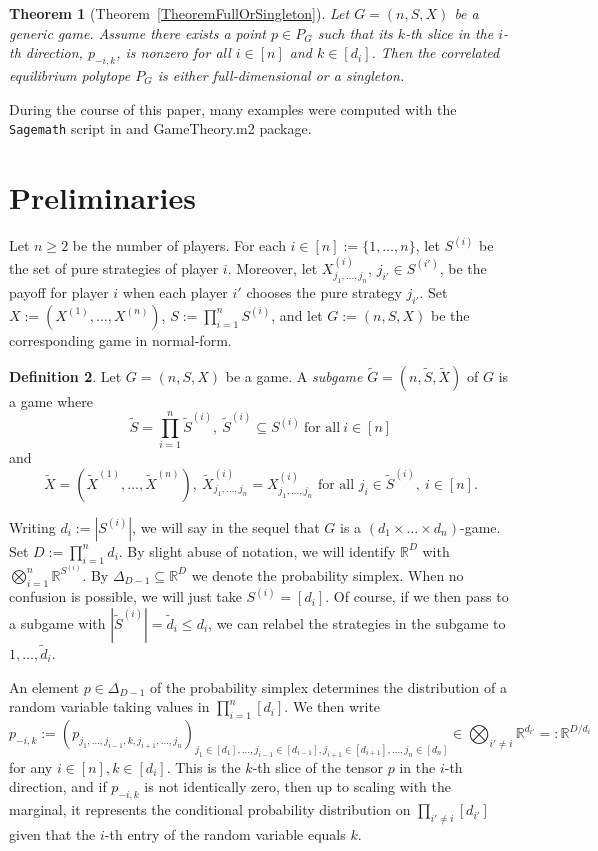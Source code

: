 \documentclass[11pt]{amsart}
\newtheorem{theorem}{Theorem}[section]
\theoremstyle{definition}
\newtheorem{definition}[theorem]{Definition}
\numberwithin{subcase}{case}
\renewcommand{\tilde}[1]{\widetilde{#1}}
\newcommand{\RR}{{\mathbb R}}
\begin{document}
\begin{theorem}[{Theorem~\ref{TheoremFullOrSingleton}}]
Let $G=(n,S,X)$ be a generic game. Assume there exists a point $p \in P_G$ such that its $k$-th slice in the $i$-th direction, $p_{-i,k}$, is nonzero for all $i \in [n]$ and $k \in [d_i]$. Then the correlated equilibrium polytope $P_G$ is either full-dimensional or a singleton.     
\end{theorem}



During the course of this paper, many examples were computed with the \texttt{Sagemath} script in \cite{SageCode} and GameTheory.m2 \cite{connelly2025gametheory} package.
\section{Preliminaries}
Let $n \geq 2$ be the number of players. For each $i \in
[n]:=\{1,\ldots,n\}$, let
$S^{(i)}$ be the set of pure strategies of player $i$. Moreover, let
$X^{(i)}_{j_1, \dots, j_n}$, $j_{i'} \in S^{(i')}$, be the payoff for
player $i$ when each player $i'$ chooses the pure strategy $j_{i'}$.
Set $X:=(X^{(1)}, \dots, X^{(n)})$, $S:=\prod_{i=1}^n S^{(i)}$, and
let $G:=(n,S,X)$ be the corresponding game in normal-form. 

\begin{definition}
Let $G=(n,S,X)$ be a game. A \textit{subgame}
$\tilde{G}=(n,\tilde{S},\tilde{X})$ of $G$ is a game where \[
\tilde{S}=\prod_{i=1}^n \tilde{S}^{(i)}, \ \tilde{S}^{(i)}
\subseteq S^{(i)} \ \text{for all} \ i \in [n] \] and
\[\tilde{X}=(\tilde{X}^{(1)}, \dots, \tilde{X}^{(n)}), \
\tilde{X}^{(i)}_{j_1, \dots, j_n}=X^{(i)}_{j_1, \dots, j_n} \text{ for
all } j_i \in \tilde{S}^{(i)}, \ i \in [n].\]
\end{definition}

Writing $d_i:=|S^{(i)}|$, we will say in the sequel that $G$ is a $(d_1
\times  \dots \times d_n)$-game. Set $D:=\prod_{i=1}^n d_i$. By slight
abuse of notation, we will identify $\RR^D$ with $\bigotimes_{i=1}^n
\RR^{S^{(i)}}$. By $\Delta_{D-1} \subseteq \RR^D$ we denote the
probability simplex. When no confusion is possible, we will just take
$S^{(i)}=[d_i]$. Of course, if we then pass to a subgame
with $|\tilde{S}^{(i)}|=\tilde{d}_i \leq d_i$, we can relabel the strategies in
the subgame to $1,\ldots,\tilde{d}_i$.

An element $p \in \Delta_{D-1}$ of the probability simplex determines
the distribution of a random variable taking values in $\prod_{i=1}^n [d_i]$. We then write
\[p_{-i,k}:=(p_{j_1, \dots ,j_{i-1},k,j_{i+1}, \dots, j_n})_{j_1 \in
[d_1], \dots, j_{i-1} \in [d_{i-1}], j_{i+1} \in [d_{i+1}], \dots, j_{n}
\in [d_{n}] } \in \bigotimes_{i' \neq i} \RR^{d_{i'}}=:\RR^{D/d_i}\]
for any $i \in [n], k \in [d_i]$. This is the $k$-th
slice of the tensor $p$ in the $i$-th direction, and if $p_{-i,k}$ is
not identically zero, then
up to scaling with the marginal, it represents the conditional probability distribution on
$\prod_{i' \neq i} [d_{i'}]$ given that the $i$-th entry of the random
variable equals $k$.
\end{document}

